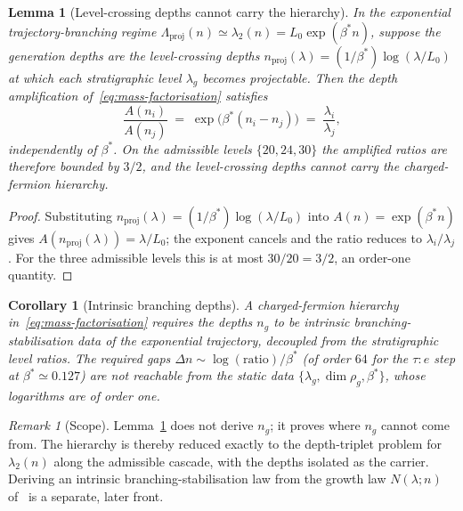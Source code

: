 \documentclass[11pt]{article}
\newtheorem{lemma}{Lemma}
\newtheorem{corollary}{Corollary}
\theoremstyle{definition}
\theoremstyle{remark}
\newtheorem{remark}{Remark}
\begin{document}
      \begin{lemma}[Level-crossing depths cannot carry the hierarchy]
        \label{lem:level-crossing-cancellation}
        In the exponential trajectory-branching regime \(\Lambda_{\mathrm{proj}}(n)\simeq\lambda_2(n) =
        L_0\exp(\beta^{\ast} n)\), suppose the generation depths are the level-crossing depths
        \(n_{\mathrm{proj}}(\lambda) = (1/\beta^{\ast})\log(\lambda/L_0)\) at which each stratigraphic level
        \(\lambda_g\) becomes projectable.
        Then the depth amplification of~\eqref{eq:mass-factorisation} satisfies
        \begin{equation}
          \label{eq:level-crossing-cancellation}
          \frac{A(n_i)}{A(n_j)} \;=\; \exp\!\bigl(\beta^{\ast}(n_i-n_j)\bigr) \;=\; \frac{\lambda_i}{\lambda_j},
        \end{equation}
        independently of \(\beta^{\ast}\).
        On the admissible levels \(\{20,24,30\}\) the amplified ratios are therefore bounded by \(3/2\), and the
        level-crossing depths cannot carry the charged-fermion hierarchy.
      \end{lemma}
      \begin{proof}
        Substituting \(n_{\mathrm{proj}}(\lambda) = (1/\beta^{\ast})\log(\lambda/L_0)\) into
        \(A(n)=\exp(\beta^{\ast} n)\) gives \(A(n_{\mathrm{proj}}(\lambda)) = \lambda/L_0\); the exponent cancels
        and the ratio reduces to \(\lambda_i/\lambda_j\).
        For the three admissible levels this is at most \(30/20=3/2\), an order-one quantity.
      \end{proof}

      \begin{corollary}[Intrinsic branching depths]
        \label{cor:intrinsic-branching-depths}
        A charged-fermion hierarchy in~\eqref{eq:mass-factorisation} requires the depths \(n_g\) to be intrinsic
        branching-stabilisation data of the exponential trajectory, decoupled from the stratigraphic level ratios.
        The required gaps \(\Delta n \sim \log(\text{ratio})/\beta^{\ast}\) (of order \(64\) for the \(\tau\!:\!e\)
        step at \(\beta^{\ast}\simeq 0.127\)) are not reachable from the static data
        \(\{\lambda_g,\dim\rho_g,\beta^{\ast}\}\), whose logarithms are of order one.
      \end{corollary}

      \begin{remark}[Scope]
        \label{rem:depths-scope}
        Lemma~\ref{lem:level-crossing-cancellation} does not derive \(n_g\); it proves where \(n_g\) cannot come
        from.
        The hierarchy is thereby reduced exactly to the depth-triplet problem for \(\lambda_2(n)\) along the
        admissible cascade, with the depths isolated as the carrier.
        Deriving an intrinsic branching-stabilisation law from the growth law \(N(\lambda;n)\) of~\cite{Beau2026a5}
        is a separate, later front.
      \end{remark}
\end{document}
